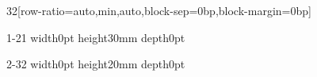 \documentclass[paper={120mm,60mm}]{ropas-poster}
\begin{document}
\begin{postergrid}{3}{2}[row-ratio={auto,min,auto},block-sep=0bp,block-margin=0bp]
\begin{posterblock}{1-2}{1}
\noindent\vrule width0pt height30mm depth0pt
\end{posterblock}
\begin{posterblock}{2-3}{2}
\noindent\vrule width0pt height20mm depth0pt
\end{posterblock}
\end{postergrid}
\end{document}
